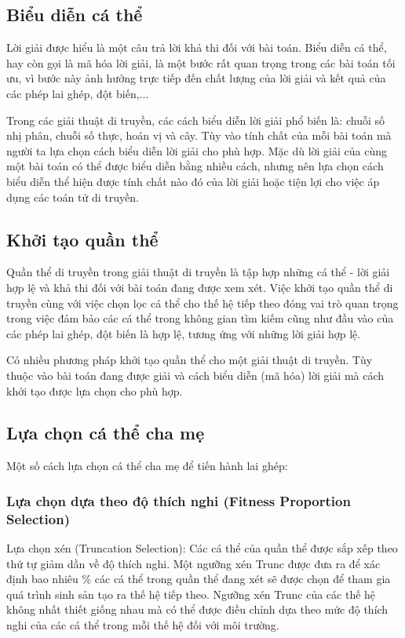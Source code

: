 \subsection{Biểu diễn cá thể} \label{chap_coso:sec_ga:subsec:bieudien}
Lời giải được hiểu là một câu trả lời khả thi đối với bài toán. Biểu diễn cá thể, hay còn gọi là mã hóa lời giải, là một bước rất quan trọng trong các bài toán tối ưu, vì bước này ảnh hưởng trực tiếp đến chất lượng của lời giải và kết quả của các phép lai ghép, đột biến,...

Trong các giải thuật di truyền, các cách biểu diễn lời giải phổ biến là: chuỗi số nhị phân, chuỗi số thực, hoán vị và cây. Tùy vào tính chất của mỗi bài toán mà người ta lựa chọn cách biểu diễn lời giải cho phù hợp. Mặc dù lời giải của cùng một bài toán có thể được biểu diễn bằng nhiều cách, nhưng nên lựa  chọn cách biểu diễn thể hiện được tính chất nào đó của lời giải hoặc tiện lợi cho việc áp dụng các toán tử di truyền.

\subsection{Khởi tạo quần thể} \label{chap_coso:sec_ga:subsec:khoitaoquanthe}
Quần thể di truyền trong giải thuật di truyền là tập hợp những cá thể - lời giải hợp lệ và khả thi đối với bài toán đang được xem xét. Việc khởi tạo quần thể di truyền cùng với việc chọn lọc cá thể cho thế hệ tiếp theo đóng vai trò quan trọng trong việc đảm bảo các cá thể trong không gian tìm kiếm cũng như đầu vào của các phép lai ghép, đột biến là hợp lệ, tương ứng với những lời giải hợp lệ.

Có nhiều phương pháp khởi tạo quần thể cho một giải thuật di truyền. Tùy thuộc vào bài toán đang được giải và cách biểu diễn (mã hóa) lời giải mà cách khởi tạo được lựa chọn cho phù hợp.

\subsection{Lựa chọn cá thể cha mẹ} \label{chap_coso:sec_ga:subsec:luachoncathechame}
Một số cách lựa chọn cá thể cha mẹ để tiến hành lai ghép:

\subsubsection{Lựa chọn dựa theo độ thích nghi (Fitness Proportion Selection)}
Lựa chọn xén (Truncation Selection): Các cá thể của quần thể được sắp xếp theo thứ tự giảm dần về độ thích nghi. Một ngưỡng xén Trunc được đưa ra để xác định bao nhiêu \% các cá thể trong quần thể đang xét sẽ được chọn để tham gia quá trình sinh sản tạo ra thế hệ tiếp theo. Ngưỡng xén Trunc của các thế hệ không nhất thiết giống nhau mà có thể được điều chỉnh dựa theo mức độ thích nghi của các cá thể trong mỗi thế hệ đối với môi trường.

